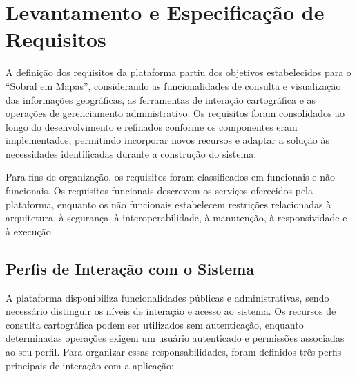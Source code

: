 \FloatBarrier
\section{Levantamento e Especificação de Requisitos}
\label{sec:requisitos}

A definição dos requisitos da plataforma partiu dos objetivos estabelecidos para o ``Sobral em Mapas'', considerando as funcionalidades de consulta e visualização das informações geográficas, as ferramentas de interação cartográfica e as operações de gerenciamento administrativo. Os requisitos foram consolidados ao longo do desenvolvimento e refinados conforme os componentes eram implementados, permitindo incorporar novos recursos e adaptar a solução às necessidades identificadas durante a construção do sistema.

Para fins de organização, os requisitos foram classificados em funcionais e não funcionais. Os requisitos funcionais descrevem os serviços oferecidos pela plataforma, enquanto os não funcionais estabelecem restrições relacionadas à arquitetura, à segurança, à interoperabilidade, à manutenção, à responsividade e à execução.

\subsection{Perfis de Interação com o Sistema}
\label{sec:perfis-usuario}

A plataforma disponibiliza funcionalidades públicas e administrativas, sendo necessário distinguir os níveis de interação e acesso ao sistema. Os recursos de consulta cartográfica podem ser utilizados sem autenticação, enquanto determinadas operações exigem um usuário autenticado e permissões associadas ao seu perfil. Para organizar essas responsabilidades, foram definidos três perfis principais de interação com a aplicação:

